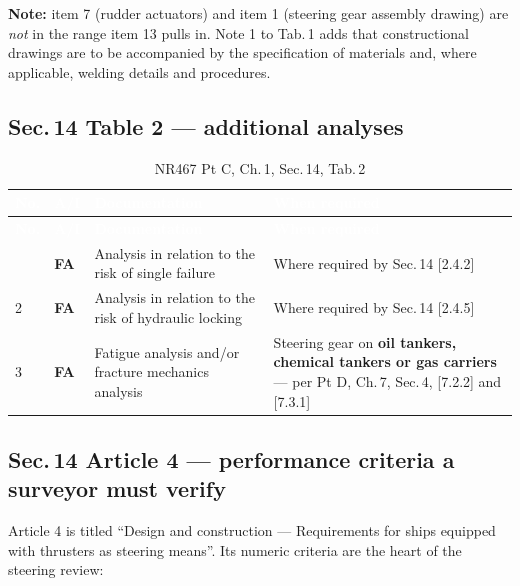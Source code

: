 \documentclass[11pt,a4paper]{report}
\newcommand{\fa}{\textbf{\textcolor{warningred}{FA}}}
\begin{document}
\noindent\textbf{Note:} item 7 (rudder actuators) and item 1 (steering gear
assembly drawing) are \emph{not} in the range item 13 pulls in. Note 1 to Tab.\,1
adds that constructional drawings are to be accompanied by the specification of
materials and, where applicable, welding details and procedures.

\subsection{Sec.\,14 Table 2 --- additional analyses}
\begin{longtable}{|p{0.7cm}|p{1.1cm}|p{5.8cm}|p{6.4cm}|}
\caption{NR467 Pt C, Ch.\,1, Sec.\,14, Tab.\,2} \label{tab:s14t2} \\
\hline
\rowcolor{bvblue}
\textcolor{white}{\textbf{No.}} & \textcolor{white}{\textbf{A/I}} & \textcolor{white}{\textbf{Documentation}} & \textcolor{white}{\textbf{When required}} \\
\hline
\endfirsthead
\hline
\rowcolor{bvblue}
\textcolor{white}{\textbf{No.}} & \textcolor{white}{\textbf{A/I}} & \textcolor{white}{\textbf{Documentation}} & \textcolor{white}{\textbf{When required}} \\
\hline
\endhead
\hline
\endlastfoot
1 & \fa{} & Analysis in relation to the risk of single failure & Where required by Sec.\,14 [2.4.2] \\
\hline
2 & \fa{} & Analysis in relation to the risk of hydraulic locking & Where required by Sec.\,14 [2.4.5] \\
\hline
3 & \fa{} & Fatigue analysis and/or fracture mechanics analysis & Steering gear on \textbf{oil tankers, chemical tankers or gas carriers} --- per Pt D, Ch.\,7, Sec.\,4, [7.2.2] and [7.3.1] \\
\hline
\end{longtable}

\subsection{Sec.\,14 Article 4 --- performance criteria a surveyor must verify}
\label{sec:s14art4}

Article 4 is titled ``Design and construction --- Requirements for ships equipped
with thrusters as steering means''. Its numeric criteria are the heart of the
steering review:
\end{document}
